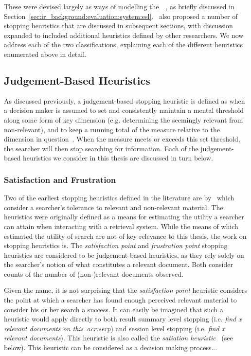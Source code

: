 These were devised largely as ways of modelling the~~\citep{cooper1968expected_search_length}, as briefly discussed in Section~\ref{sec:ir_background:evaluation:system:esl}.~\cite{nickles1995judgment} also proposed a number of stopping heuristics that are discussed in subsequent sections, with discussion expanded to included additional heuristics defined by other researchers. We now address each of the two classifications, explaining each of the different heuristics enumerated above in detail.

\subsection{Judgement-Based Heuristics}\label{sec:stopping_background:heuristics:judgement}
As discussed previously, a judgement-based stopping heuristic is defined as when a decision maker is assumed to set and consistently maintain a mental threshold along some form of key dimension (e.g. determining the seemingly relevant from non-relevant), and to keep a running total of the measure relative to the dimension in question~\citep{gettys1979hypothesis, nickles1995judgment}. When the measure meets or exceeds this set threshold, the searcher will then stop searching for information. Each of the judgement-based heuristics we consider in this thesis are discussed in turn below.

\subsubsection{Satisfaction and Frustration}\label{sec:stopping_background:heuristics:frustration}
Two of the earliest stopping heuristics defined in the literature are by~\cite{cooper1973retrieval_effectiveness_ii} which consider a searcher's tolerance to relevant and non-relevant material. The heuristics were originally defined as a means for estimating the utility a searcher can attain when interacting with a retrieval system. While the means of which~\cite{cooper1973retrieval_effectiveness_ii} estimated the utility of search are not of key relevance to this thesis, the work on stopping heuristics is. The \emph{satisfaction point} and \emph{frustration point} stopping heuristics are considered to be judgement-based heuristics, as they rely solely on the searcher's notion of what constitutes a relevant document. Both consider counts of the number of (non-)relevant documents observed.

Given the name, it is not surprising that the \emph{satisfaction point} heuristic considers the point at which a searcher has found enough perceived relevant material to consider his or her search a success. It can easily be imagined that such a heuristic would apply directly to both result summary level stopping (i.e. \emph{find $x$ relevant documents on this~\gls{acr:serp}}) and session level stopping (i.e. \emph{find $x$ relevant documents}). This heuristic is also called the \emph{satiation heuristic}~\citep{simon1955satiation} (see below). This heuristic can be considered as a decision making process...

